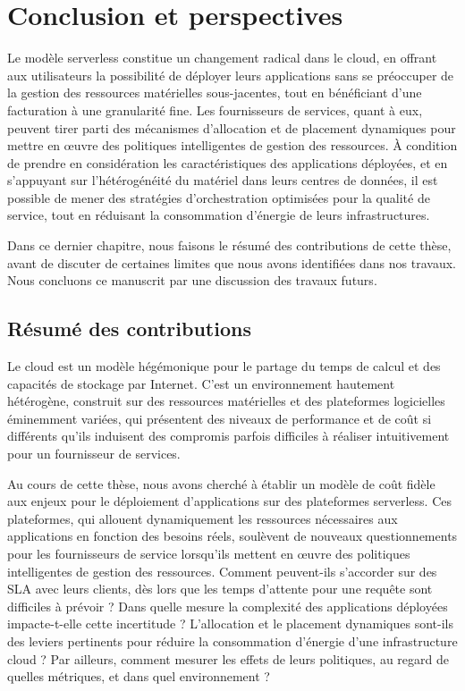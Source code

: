 \chapter{Conclusion et perspectives}
\label{chapter:conclusion}

Le modèle serverless constitue un changement radical dans le cloud, en offrant aux utilisateurs la possibilité de déployer leurs applications sans se préoccuper de la gestion des ressources matérielles sous-jacentes, tout en bénéficiant d'une facturation à une granularité fine. Les fournisseurs de services, quant à eux, peuvent tirer parti des mécanismes d'allocation et de placement dynamiques pour mettre en œuvre des politiques intelligentes de gestion des ressources. À condition de prendre en considération les caractéristiques des applications déployées, et en s'appuyant sur l'hétérogénéité du matériel dans leurs centres de données, il est possible de mener des stratégies d'orchestration optimisées pour la qualité de service, tout en réduisant la consommation d'énergie de leurs infrastructures.

Dans ce dernier chapitre, nous faisons le résumé des contributions de cette thèse, avant de discuter de certaines limites que nous avons identifiées dans nos travaux. Nous concluons ce manuscrit par une discussion des travaux futurs.

\section{Résumé des contributions}
\label{section:conclusion-summary}

Le cloud est un modèle hégémonique pour le partage du temps de calcul et des capacités de stockage par Internet. C'est un environnement hautement hétérogène, construit sur des ressources matérielles et des plateformes logicielles éminemment variées, qui présentent des niveaux de performance et de coût si différents qu'ils induisent des compromis parfois difficiles à réaliser intuitivement pour un fournisseur de services.

Au cours de cette thèse, nous avons cherché à établir un modèle de coût fidèle aux enjeux pour le déploiement d'applications sur des plateformes serverless. Ces plateformes, qui allouent dynamiquement les ressources nécessaires aux applications en fonction des besoins réels, soulèvent de nouveaux questionnements pour les fournisseurs de service lorsqu'ils mettent en œuvre des politiques intelligentes de gestion des ressources. Comment peuvent-ils s'accorder sur des \gls{SLA} avec leurs clients, dès lors que les temps d'attente pour une requête sont difficiles à prévoir ? Dans quelle mesure la complexité des applications déployées impacte-t-elle cette incertitude ? L'allocation et le placement dynamiques sont-ils des leviers pertinents pour réduire la consommation d'énergie d'une infrastructure cloud ? Par ailleurs, comment mesurer les effets de leurs politiques, au regard de quelles métriques, et dans quel environnement ?

